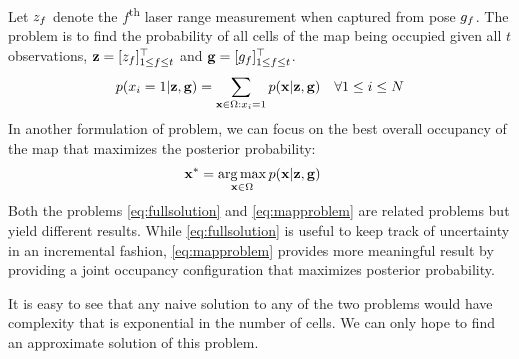 \documentclass[letterpaper, 10 pt, conference]{ieeeconf} %
\DeclareMathOperator*{\argmax}{arg\,max}
\begin{document}
Let $z_f$ denote the $f$\textsuperscript{th} laser range measurement when captured from pose $g_f$. 
The problem is to find the probability of all cells of the map being occupied
given all $t$ observations, $\mathbf{z} = [z_f]^\top_{1 \le f \le t}$ and
$\mathbf{g} = [g_f]^\top_{1 \le f \le t}$.
\begin{align}
  p(x_i = 1 | \mathbf{z}, \mathbf{g}) &= \sum_{\mathbf{x} \in \Omega : x_i = 1} p(\mathbf{x} | \mathbf{z} , \mathbf{g}) & \forall 1 \le i \le N 
  \label{eq:fullsolution}
\end{align}
In another formulation of problem, we can focus on the best overall occupancy of the map that maximizes the posterior probability:
\begin{align}
  \map^* &= \argmax_{\map \in \Omega } p(\map | \measurements, \poses)
  \label{eq:mapproblem}
\end{align}
Both the problems \eqref{eq:fullsolution} and \eqref{eq:mapproblem} are related
problems but yield different results. While \eqref{eq:fullsolution} is
useful to keep track of uncertainty in an incremental fashion,
\eqref{eq:mapproblem} provides more meaningful result by providing a joint
occupancy configuration that maximizes posterior probability.

It is easy to see that any naive solution to any of the two problems would have complexity that is exponential in the number of cells. We can only hope to find an approximate solution of this problem.
\end{document}
